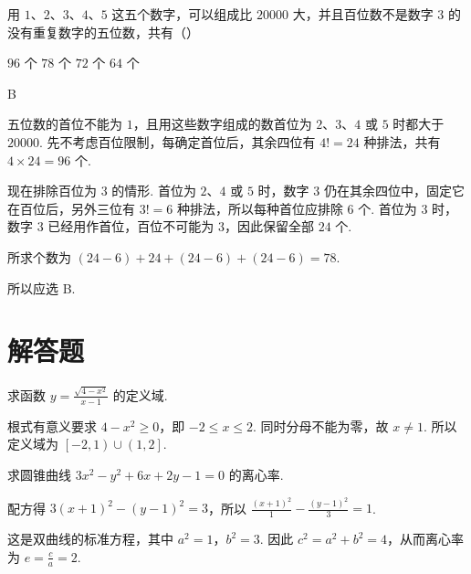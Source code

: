 \documentclass[UTF8,a4paper,oneside,11pt]{ctexbook}
\begin{document}
\begin{problem}

用 \(1\)、\(2\)、\(3\)、\(4\)、\(5\) 这五个数字，可以组成比 \(20000\) 大，并且百位数不是数字 \(3\) 的没有重复数字的五位数，共有（\quad）

\choices
    {\(96\text{ 个}\)}
    {\(78\text{ 个}\)}
    {\(72\text{ 个}\)}
    {\(64\text{ 个}\)}

\begin{answer}
B
\end{answer}

\begin{solution}
五位数的首位不能为 \(1\)，且用这些数字组成的数首位为 \(2\)、\(3\)、\(4\) 或 \(5\) 时都大于 \(20000\). 先不考虑百位限制，每确定首位后，其余四位有 \(4!=24\) 种排法，共有 \(4\times24=96\) 个.

现在排除百位为 \(3\) 的情形. 首位为 \(2\)、\(4\) 或 \(5\) 时，数字 \(3\) 仍在其余四位中，固定它在百位后，另外三位有 \(3!=6\) 种排法，所以每种首位应排除 \(6\) 个. 首位为 \(3\) 时，数字 \(3\) 已经用作首位，百位不可能为 \(3\)，因此保留全部 \(24\) 个.

所求个数为
\(\left(24-6\right)+24+\left(24-6\right)+\left(24-6\right)=78\).

所以应选 B.
\end{solution}
\end{problem}

\section{解答题}

\begin{problem}

求函数 \(y = \frac{\sqrt{4 - x^2}}{x - 1} \) 的定义域.
\end{problem}

\begin{solution}
根式有意义要求 \(4-x^2\geqslant0\)，即 \(-2\leqslant x\leqslant2\). 同时分母不能为零，故 \(x\ne1\). 所以定义域为 \(\left[-2,1\right)\cup\left(1,2\right]\).
\end{solution}

\begin{problem}

求圆锥曲线 \(3x^{2} - y^{2} + 6x + 2y - 1 = 0\) 的离心率.
\end{problem}

\begin{solution}
配方得 \(3\left(x+1\right)^2-\left(y-1\right)^2=3\)，所以
\(\frac{\left(x+1\right)^2}{1}-\frac{\left(y-1\right)^2}{3}=1\).

这是双曲线的标准方程，其中 \(a^2=1\)，\(b^2=3\). 因此 \(c^2=a^2+b^2=4\)，从而离心率为 \(e=\frac{c}{a}=2\).
\end{solution}
\end{document}
